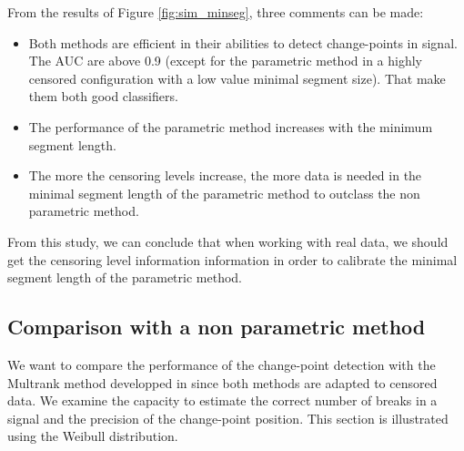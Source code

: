 From the results of Figure \ref{fig:sim_minseg}, three comments can be made:  
\begin{itemize}
\item Both methods are efficient in their abilities to detect change-points in signal. The AUC are above 0.9 (except for the parametric method in a highly censored configuration with a low value minimal segment size). That make them both good classifiers. 
\item The performance of the parametric method increases with the minimum segment length. 
\item The more the censoring levels increase, the more data is needed in the minimal segment length of the parametric method to outclass the non parametric method. 
\end{itemize}
From this study, we can conclude that when working with real data, we should get the censoring level information information in order to calibrate the minimal segment length of the parametric method.  

\subsection{Comparison with a non parametric method}

We want to compare the performance of the change-point detection with the Multrank method developped in \cite{lung2015} since both methods are adapted to censored data. We examine the capacity to estimate the correct number of breaks in a signal and the precision of the change-point position. This section is illustrated using the Weibull distribution.   

